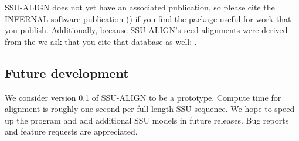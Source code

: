 SSU-ALIGN does not yet have an associated publication,
so please cite the INFERNAL software publication
(\cite{Nawrocki09}) if you find the package useful for work that
you publish. Additionally, because SSU-ALIGN's seed alignments were
derived from the  we ask that you cite
that database as well: \cite{CannoneGutell02}. 

\subsection{Future development}

We consider version 0.1 of SSU-ALIGN to be a prototype. 
Compute time for alignment is roughly one second per full length SSU
sequence. We hope to speed up the program and add additional SSU
models in future releases. Bug reports and feature requests are
appreciated.



